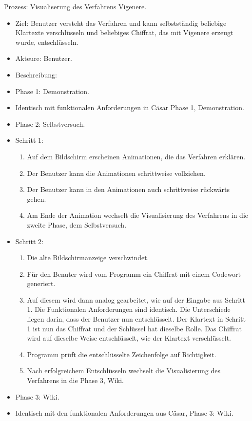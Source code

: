 \documentclass{article}
\begin{document}
\begin{FA}[start=120]
 \item Prozess: Visualiserung des Verfahrens Vigenere.
\end{FA}
\begin{itemize}[label={}]
 \item Ziel: Benutzer versteht das Verfahren und kann selbstständig beliebige Klartexte verschlüsseln und beliebiges Chiffrat, das mit Vigenere erzeugt wurde, entschlüsseln.
 \item Akteure: Benutzer.
 \item Beschreibung:
 \item Phase 1: Demonstration.
 \item Identisch mit funktionalen Anforderungen in Cäsar Phase 1, Demonstration. 
 \item Phase 2: Selbstversuch.
 \item Schritt 1:
 \begin{enumerate}
  \item Auf dem Bildschirm erscheinen Animationen, die das Verfahren erklären.
  \item Der Benutzer kann die Animationen schrittweise vollziehen.
  \item Der Benutzer kann in den Animationen auch schrittweise rückwärts gehen. 
  \item Am Ende der Animation wechselt die Visualisierung des Verfahrens in die zweite Phase, dem Selbstversuch.
 \end{enumerate}
 \item Schritt 2:
 \begin{enumerate}
  \item Die alte Bildschirmanzeige verschwindet.
  \item Für den Benuter wird vom Programm ein Chiffrat mit einem Codewort generiert. 
  \item[] Auf diesem wird dann analog gearbeitet, wie auf der Eingabe aus Schritt 1. Die Funktionalen Anforderungen sind identisch.
        Die Unterschiede liegen darin, dass der Benutzer nun entschlüsselt. 
        Der Klartext in Schritt 1 ist nun das Chiffrat und der Schlüssel hat dieselbe Rolle.
        Das Chiffrat wird auf dieselbe Weise entschlüsselt, wie der Klartext verschlüsselt. 
  \item Programm prüft die entschlüsselte Zeichenfolge auf Richtigkeit.
  \item Nach erfolgreichem Entschlüsseln wechselt die Visualisierung des Verfahrens in die Phase 3, Wiki.
 \end{enumerate}
 \item Phase 3: Wiki.
 \item Identisch mit den funktionalen Anforderungen aus Cäsar, Phase 3: Wiki.
\end{itemize}
\end{document}
